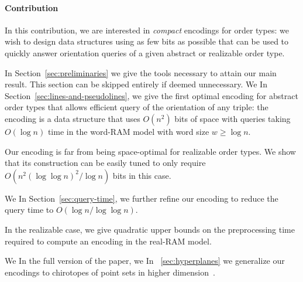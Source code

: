 


\paragraph{Contribution}

In this contribution, we are interested in \emph{compact} encodings for
order types: we wish to design data structures using as few bits as possible
that can be used to quickly answer orientation queries of a given abstract or
realizable order type.
\ifeurocg%

\fi%
%
\ifjournal%
	In Section~\ref{sec:preliminaries} we give the tools necessary to
	attain our main result. This section can be skipped entirely if deemed
	unnecessary.
\fi%
\ifeurocg%
We \else%
In Section~\ref{sec:lines-and-pseudolines}, we \fi%
give the first optimal encoding for abstract
order types that allows efficient query of the orientation of any triple: the
encoding is a data structure that uses \( O(n^2) \) bits of space with queries
taking \(O(\log n)\) time in the word-RAM model with word size \(w \geq \log
n\).
\ifeurocg%

\fi%
%
Our encoding is far from being space-optimal for realizable order types.
We show that its construction can be easily tuned to only require \(O(n^2
{(\log{\log{n}})}^2 / \log{n})\) bits in this case.
\ifeurocg%

\fi%
%
\ifeurocg%
We \else%
In Section~\ref{sec:query-time}, we \fi%
further refine our encoding to
reduce the query time to \(O(\log{n}/\log{\log{n}})\).
\ifeurocg%


\fi%
%
In the realizable case, we give quadratic upper bounds on the
preprocessing time required to compute an encoding in the real-RAM model.
\ifeurocg%

\fi%
%
\ifeurocg%
We \else\ifsocg%
In the full version of the paper, we \else%
In \appref~\ref{sec:hyperplanes} we \fi\fi%
generalize our encodings to chirotopes of
point sets in higher dimension\ifsocg~\cite{CCILO18}\fi.
\ifeurocg%

\fi%
\ifeurocg%

\fi%
